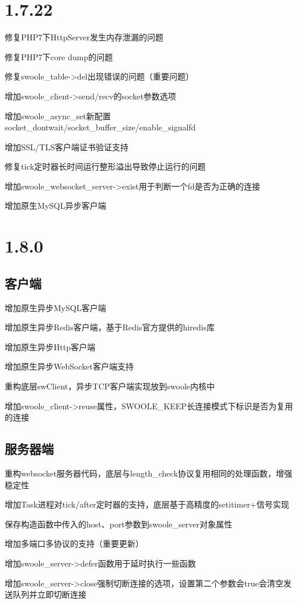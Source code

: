 \section{1.7.22}


\begin{compactitem}
\item 修复PHP7下HttpServer发生内存泄漏的问题
\item 修复PHP7下core dump的问题
\item 修复swoole\_table->del出现错误的问题（重要问题）
\item 增加swoole\_client->send/recv的socket参数选项
\item 增加swoole\_async\_set新配置socket\_dontwait/socket\_buffer\_size/enable\_signalfd
\item 增加SSL/TLS客户端证书验证支持
\item 修复tick定时器长时间运行整形溢出导致停止运行的问题
\item 增加swoole\_websocket\_server->exist用于判断一个fd是否为正确的连接
\item 增加原生MySQL异步客户端
\end{compactitem}


\section{1.8.0}


\subsection{客户端}


\begin{compactitem}
\item 增加原生异步MySQL客户端
\item 增加原生异步Redis客户端，基于Redis官方提供的hiredis库
\item 增加原生异步Http客户端
\item 增加原生异步WebSocket客户端支持
\item 重构底层swClient，异步TCP客户端实现放到swoole内核中
\item 增加swoole\_client->reuse属性，SWOOLE\_KEEP长连接模式下标识是否为复用的连接
\end{compactitem}

\subsection{服务器端}


\begin{compactitem}
\item 重构websocket服务器代码，底层与length\_check协议复用相同的处理函数，增强稳定性
\item 增加Task进程对tick/after定时器的支持，底层基于高精度的setitimer+信号实现
\item 保存构造函数中传入的host、port参数到swoole\_server对象属性
\item 增加多端口多协议的支持（重要更新）
\item 增加swoole\_server->defer函数用于延时执行一些函数
\item 增加swoole\_server->close强制切断连接的选项，设置第二个参数会true会清空发送队列并立即切断连接
\end{compactitem}

